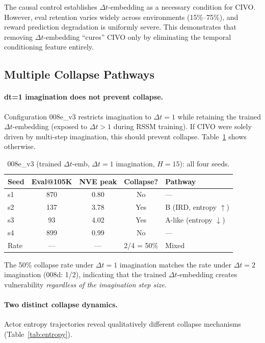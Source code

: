 \documentclass[10pt,letterpaper]{article}
\newcommand{\dt}{\Delta t}
\begin{document}
The causal control establishes $\dt$-embedding as a necessary condition for CIVO. However, eval retention varies widely across environments (15\%--75\%), and reward prediction degradation is uniformly severe. This demonstrates that removing $\dt$-embedding ``cures'' CIVO only by eliminating the temporal conditioning feature entirely.

\subsection{Multiple Collapse Pathways}
\label{sec:pathways}

\paragraph{dt=1 imagination does not prevent collapse.}
Configuration 008e\_v3 restricts imagination to $\dt = 1$ while retaining the trained $\dt$-embedding (exposed to $\dt > 1$ during RSSM training). If CIVO were solely driven by multi-step imagination, this should prevent collapse. Table~\ref{tab:008ev3_seeds} shows otherwise.

\begin{table}[h]
\centering
\caption{008e\_v3 (trained $\dt$-emb, $\dt=1$ imagination, $H=15$): all four seeds.}
\label{tab:008ev3_seeds}
\begin{tabular}{lcccl}
\toprule
\textbf{Seed} & \textbf{Eval@105K} & \textbf{NVE peak} & \textbf{Collapse?} & \textbf{Pathway} \\
\midrule
s1 & 870 & 0.80 & No  & --- \\
s2 & 137 & 3.78 & Yes & B (IRD, entropy $\uparrow$) \\
s3 & 93  & 4.02 & Yes & A-like (entropy $\downarrow$) \\
s4 & 899 & 0.99 & No  & --- \\
\midrule
Rate & --- & --- & 2/4 = 50\% & Mixed \\
\bottomrule
\end{tabular}
\end{table}

The 50\% collapse rate under $\dt = 1$ imagination matches the rate under $\dt = 2$ imagination (008d: 1/2), indicating that the trained $\dt$-embedding creates vulnerability \emph{regardless of the imagination step size}.

\paragraph{Two distinct collapse dynamics.}
Actor entropy trajectories reveal qualitatively different collapse mechanisms (Table~\ref{tab:entropy}).
\end{document}
